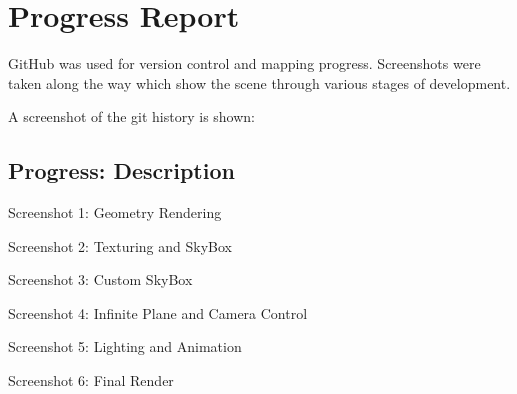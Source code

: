 \chapter{Progress Report}

GitHub was used for version control and mapping progress. Screenshots were taken along the way which show the scene through various stages of development.

A screenshot of the git history is shown:


\newpage
\section*{\Huge{Progress: Description}}

Screenshot 1: Geometry Rendering

Screenshot 2: Texturing and SkyBox

Screenshot 3: Custom SkyBox

Screenshot 4: Infinite Plane and Camera Control

Screenshot 5: Lighting and Animation

Screenshot 6: Final Render

\newpage
